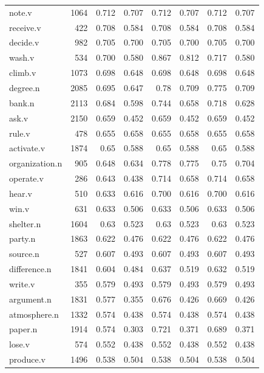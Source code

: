 \documentclass{article}
\begin{document}
\begin{longtable}{l | r r r r r r r}
note.v      	&	1064	&	0.712	&	0.707	&	0.712	&	0.707	&	0.712	&	0.707\\
receive.v    	&	422 	&	0.708	&	0.584	&	0.708	&	0.584	&	0.708	&	0.584\\
decide.v    	&	982 	&	0.705	&	0.700	&	0.705	&	0.700	&	0.705	&	0.700\\
wash.v      	&	534 	&	0.700	&	0.580	&	0.867	&	0.812	&	0.717	&	0.580\\
climb.v     	&	1073	&	0.698	&	0.648	&	0.698	&	0.648	&	0.698	&	0.648\\
degree.n    	&	2085	&	0.695	&	0.647	&	0.78	&	0.709	&	0.775	&	0.709\\
bank.n      	&	2113	&	0.684	&	0.598   &	0.744	&	0.658	&	0.718	&	0.628\\
ask.v       	&	2150	&	0.659	&	0.452	&	0.659	&	0.452	&	0.659	&	0.452\\
rule.v      	&	478 	&	0.655	&	0.658	&	0.655	&	0.658	&	0.655	&	0.658\\
activate.v    	&	1874	&	0.65	&	0.588	&	0.65	&	0.588	&	0.65	&	0.588\\
organization.n	&	905 	&	0.648	&	0.634	&	0.778	&	0.775	&	0.75	&	0.704\\
operate.v    	&	286 	&	0.643	&	0.438	&	0.714	&	0.658	&	0.714	&	0.658\\
hear.v      	&	510 	&	0.633	&	0.616	&	0.700	&	0.616	&	0.700	&	0.616\\
win.v       	&	631 	&	0.633	&	0.506	&	0.633	&	0.506	&	0.633	&	0.506\\
shelter.n    	&	1604	&	0.63	&	0.523	&	0.63	&	0.523	&	0.63	&	0.523\\
party.n     	&	1863	&	0.622	&	0.476	&	0.622	&	0.476	&	0.622	&	0.476\\
source.n    	&	527 	&	0.607	&	0.493	&	0.607	&	0.493	&	0.607	&	0.493\\
difference.n	&	1841	&	0.604	&	0.484	&	0.637	&	0.519	&	0.632	&	0.519\\
write.v     	&	355 	&	0.579	&	0.493	&	0.579	&	0.493	&	0.579	&	0.493\\
argument.n    	&	1831	&	0.577	&	0.355   &	0.676	&	0.426	&	0.669	&	0.426\\
atmosphere.n	&	1332	&	0.574	&	0.438	&	0.574	&	0.438	&	0.574	&	0.438\\
paper.n     	&	1914	&	0.574	&	0.303	&	0.721	&	0.371	&	0.689	&	0.371\\
lose.v      	&	574 	&	0.552	&	0.438	&	0.552	&	0.438	&	0.552	&	0.438\\
produce.v    	&	1496	&	0.538	&	0.504	&	0.538	&	0.504	&	0.538	&	0.504\\

\end{longtable}
\end{document}
